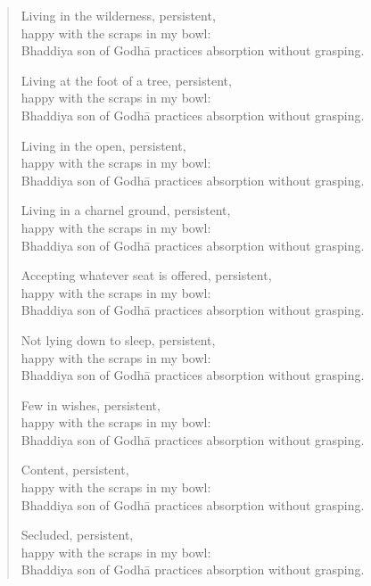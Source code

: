 \documentclass[12pt,openany]{book}%
\begin{document}
\begin{verse}
Living in the wilderness, persistent, \\
happy with the scraps in my bowl: \\
Bhaddiya son of \textsanskrit{Godhā} practices absorption without grasping. 

Living at the foot of a tree, persistent, \\
happy with the scraps in my bowl: \\
Bhaddiya son of \textsanskrit{Godhā} practices absorption without grasping. 

Living in the open, persistent, \\
happy with the scraps in my bowl: \\
Bhaddiya son of \textsanskrit{Godhā} practices absorption without grasping. 

Living in a charnel ground, persistent, \\
happy with the scraps in my bowl: \\
Bhaddiya son of \textsanskrit{Godhā} practices absorption without grasping. 

Accepting whatever seat is offered, persistent, \\
happy with the scraps in my bowl: \\
Bhaddiya son of \textsanskrit{Godhā} practices absorption without grasping. 

Not lying down to sleep, persistent, \\
happy with the scraps in my bowl: \\
Bhaddiya son of \textsanskrit{Godhā} practices absorption without grasping. 

Few in wishes, persistent, \\
happy with the scraps in my bowl: \\
Bhaddiya son of \textsanskrit{Godhā} practices absorption without grasping. 

Content, persistent, \\
happy with the scraps in my bowl: \\
Bhaddiya son of \textsanskrit{Godhā} practices absorption without grasping. 

Secluded, persistent, \\
happy with the scraps in my bowl: \\
Bhaddiya son of \textsanskrit{Godhā} practices absorption without grasping. 


\end{verse}
\end{document}
